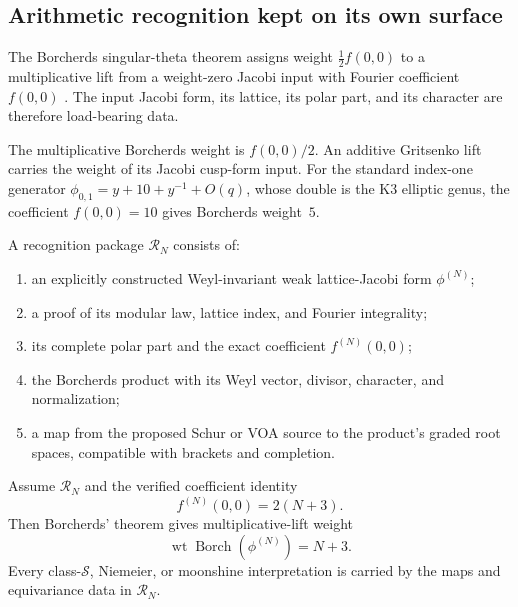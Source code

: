 \subsection{Arithmetic recognition kept on its own surface}
\label{sec:walgdeep-supplement}

The Borcherds singular-theta theorem assigns weight
\(\frac12 f(0,0)\) to a multiplicative lift from a weight-zero
Jacobi input with Fourier coefficient \(f(0,0)\)
\cite[Theorem~13.3]{Borcherds1998Grassmannian}.  The input Jacobi
form, its lattice, its polar part, and its character are therefore
load-bearing data.

\begin{remark}
\label{rem:walgdeep-W16-borch-vs-grit}
The multiplicative Borcherds weight is \(f(0,0)/2\).
An additive Gritsenko lift carries the weight of its Jacobi cusp-form
input.  For the standard index-one generator
\(\phi_{0,1}=y+10+y^{-1}+O(q)\), whose double is the K3 elliptic
genus, the coefficient \(f(0,0)=10\) gives Borcherds weight~\(5\).
\end{remark}

\begin{definition}
\label{def:walgdeep-schur-jacobi-borcherds-recognition}
\ClaimStatusDefinitional
A recognition package \(\mathcal R_N\) consists of:
\begin{enumerate}[label=\textup{(R\arabic*)}]
\item an explicitly constructed Weyl-invariant weak lattice-Jacobi
  form \(\phi^{(N)}\);
\item a proof of its modular law, lattice index, and Fourier
  integrality;
\item its complete polar part and the exact coefficient
  \(f^{(N)}(0,0)\);
\item the Borcherds product with its Weyl vector, divisor, character,
  and normalization;
\item a map from the proposed Schur or VOA source to the product's
  graded root spaces, compatible with brackets and completion.
\end{enumerate}
\end{definition}

\begin{theorem}
\label{thm:walgdeep-gaiotto-siegel-weight}
\ClaimStatusConditional
Assume \(\mathcal R_N\) and the verified coefficient identity
\[
f^{(N)}(0,0)=2(N+3).
\]
Then Borcherds' theorem gives multiplicative-lift weight
\[
\operatorname{wt}\operatorname{Borch}(\phi^{(N)})=N+3.
\]
Every class-\(\mathcal S\), Niemeier, or moonshine interpretation is
carried by the maps and equivariance data in \(\mathcal R_N\).
\end{theorem}

